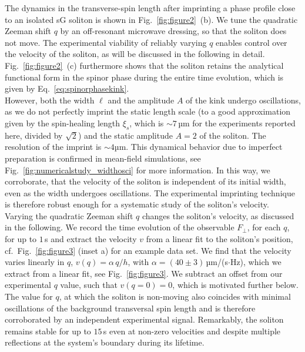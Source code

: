 \documentclass[aps,

               pra,
               twocolumn,
               amsmath,
               amssymb,
               superscriptaddress,
               reprint,
               10pt
              ]{revtex4-2}
\begin{document}
The dynamics in the transverse-spin length after imprinting a phase profile close to an isolated sG soliton is shown in Fig.~\ref{fig:figure2}~(b). We tune the quadratic Zeeman shift $q$ by an off-resonant microwave dressing, so that the soliton does not move.
The experimental viability of reliably varying $q$ enables control over the velocity of the soliton, as will be discussed in the following in detail.
Fig.~\ref{fig:figure2}~(c) furthermore shows that the soliton retains the analytical functional form in the spinor phase during the entire time evolution, which is given by Eq.~\eqref{eq:spinorphasekink}.\\
However, both the width $\ell$ and the amplitude $A$ of the kink undergo oscillations, as we do not perfectly imprint the static length scale (to a good approximation given by the spin-healing length $\xi_s$, which is $\sim 7\, \text{µm}$ for the experiments reported here, divided by $\sqrt{2}$) and the static amplitude $A=2$ of the soliton. The resolution of the imprint is $\sim 4 \text{µm}$.
This dynamical behavior due to imperfect preparation is confirmed in mean-field simulations, see Fig.~\ref{fig:numericalstudy_widthosci} for more information. In this way, we corroborate, that the velocity of the soliton is independent of its initial width, even as the width undergoes oscillations. The experimental imprinting technique is therefore robust enough for a systematic study of the soliton's velocity.\\

Varying the quadratic Zeeman shift $q$ changes the soliton's velocity, as discussed in the following.
We record the time evolution of the observable $F_{\perp}$, for each $q$, for up to $1\,$s and extract the velocity $v$ from a linear fit to the soliton's position, cf.~Fig.~\ref{fig:figure3} (inset a) for an example data set.
We find that the velocity varies linearly in $q$, $v(q) = \alpha\,q/h$, with $\alpha = (40\pm 3) \, \text{µm}$/(s$\cdot$Hz), which we extract from a linear fit, see Fig.~\ref{fig:figure3}.
We subtract an offset from our experimental $q$ value, such that $v(q=0) = 0$, which is motivated further below. The value for $q$, at which the soliton is non-moving also coincides with minimal oscillations of the background transversal spin length and is therefore corroborated by an independent experimental signal.
Remarkably, the soliton remains stable for up to $15\,$s even at non-zero velocities and despite multiple reflections at the system's boundary during its lifetime.
\end{document}
